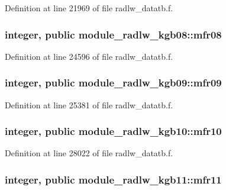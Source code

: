 Definition at line 21969 of file radlw\+\_\+datatb.\+f.

\subsubsection[{\texorpdfstring{mfr08}{mfr08}}]{\setlength{\rightskip}{0pt plus 5cm}integer, public module\+\_\+radlw\+\_\+kgb08\+::mfr08}\hypertarget{group__module__radlw__main_gabfaf0cad62f8ae42564f8127198d48f0}{}\label{group__module__radlw__main_gabfaf0cad62f8ae42564f8127198d48f0}


Definition at line 24596 of file radlw\+\_\+datatb.\+f.

\subsubsection[{\texorpdfstring{mfr09}{mfr09}}]{\setlength{\rightskip}{0pt plus 5cm}integer, public module\+\_\+radlw\+\_\+kgb09\+::mfr09}\hypertarget{group__module__radlw__main_ga777f63022c4f7187446945c6e6ba77e7}{}\label{group__module__radlw__main_ga777f63022c4f7187446945c6e6ba77e7}


Definition at line 25381 of file radlw\+\_\+datatb.\+f.

\subsubsection[{\texorpdfstring{mfr10}{mfr10}}]{\setlength{\rightskip}{0pt plus 5cm}integer, public module\+\_\+radlw\+\_\+kgb10\+::mfr10}\hypertarget{group__module__radlw__main_ga0f3944c4b86044e0c5db3dc351226c88}{}\label{group__module__radlw__main_ga0f3944c4b86044e0c5db3dc351226c88}


Definition at line 28022 of file radlw\+\_\+datatb.\+f.

\subsubsection[{\texorpdfstring{mfr11}{mfr11}}]{\setlength{\rightskip}{0pt plus 5cm}integer, public module\+\_\+radlw\+\_\+kgb11\+::mfr11}\hypertarget{group__module__radlw__main_ga9b5764441999cce52bc02e65a24420b9}{}\label{group__module__radlw__main_ga9b5764441999cce52bc02e65a24420b9}


